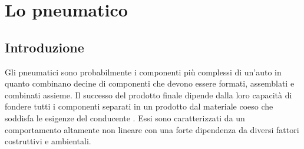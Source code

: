 \chapter{Lo pneumatico}
\label{Pneumatico}
%
\section{Introduzione}
Gli pneumatici sono probabilmente i componenti più complessi di un'auto in quanto combinano decine di componenti che devono essere formati, assemblati e combinati assieme. Il successo del prodotto finale dipende dalla loro capacità di fondere tutti i componenti separati in un prodotto dal materiale coeso che soddisfa le esigenze del conducente \cite{rill}. Essi sono caratterizzati da un comportamento altamente non lineare con una forte dipendenza da diversi fattori costruttivi e ambientali.
%
